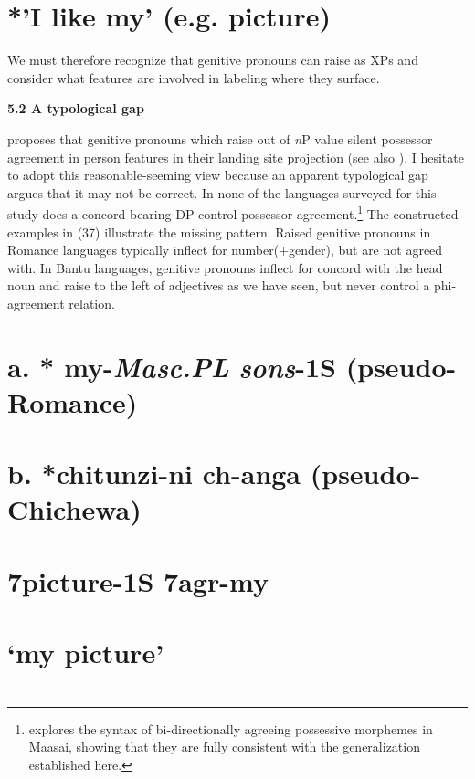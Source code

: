 \documentclass[output=paper
,modfonts
,nonflat]{langsci/langscibook}
\begin{document}
\section{  *'I like my' (e.g. picture)}

We must therefore recognize that genitive pronouns can raise as XPs and consider what features are involved in labeling where they surface. 

\textbf{5.2  A typological gap}

\citet{Giusti2008} proposes that genitive pronouns which raise out of \textit{n}P value silent possessor agreement in person features in their landing site projection (see also \citealt{Sichel2002}). I hesitate to adopt this reasonable-seeming view because an apparent typological gap argues that it may not be correct. In none of the languages surveyed for this study does a concord-bearing DP control possessor agreement.\footnote{ explores the syntax of bi-directionally agreeing possessive morphemes in Maasai, showing that they are fully consistent with the generalization established here.} The constructed examples in (37) illustrate the missing pattern. Raised genitive pronouns in Romance languages typically inflect for number(+gender), but are not agreed with. In Bantu languages, genitive pronouns inflect for concord with the head noun and raise to the left of adjectives as we have seen, but never control a phi-agreement relation. 

\section{a.     * \textbf{my}{}-\textit{Masc.PL} \textit{sons}{}-\textbf{1S} (pseudo-Romance)}
\label{bkm:Ref516054473}\section{\bfseries} 
\section{ b.    *chitunzi-ni   ch-anga       (pseudo-Chichewa)}
\section{ 7picture-1S 7agr-my}
\section{        ‘my picture’}
\section{}
\end{document}
